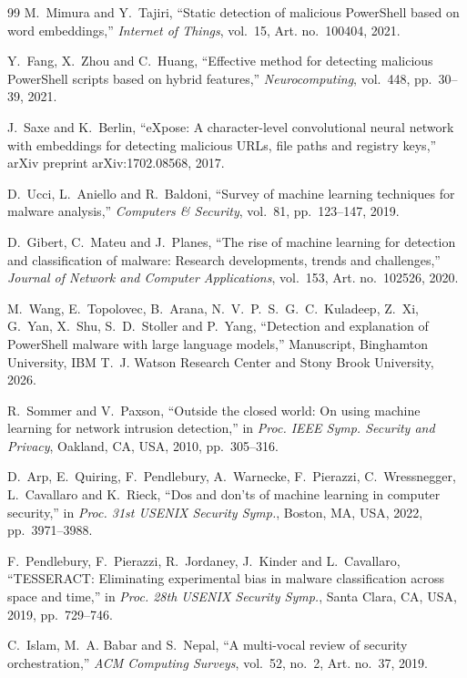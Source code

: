 \documentclass[12pt,a4paper]{article}
\begin{document}
\begin{thebibliography}{99}
 M.~Mimura and Y.~Tajiri, ``Static detection of malicious PowerShell based on word embeddings,'' \emph{Internet of Things}, vol.~15, Art. no.~100404, 2021.

 Y.~Fang, X.~Zhou and C.~Huang, ``Effective method for detecting malicious PowerShell scripts based on hybrid features,'' \emph{Neurocomputing}, vol.~448, pp.~30--39, 2021.

 J.~Saxe and K.~Berlin, ``eXpose: A character-level convolutional neural network with embeddings for detecting malicious URLs, file paths and registry keys,'' arXiv preprint arXiv:1702.08568, 2017.

 D.~Ucci, L.~Aniello and R.~Baldoni, ``Survey of machine learning techniques for malware analysis,'' \emph{Computers \& Security}, vol.~81, pp.~123--147, 2019.

 D.~Gibert, C.~Mateu and J.~Planes, ``The rise of machine learning for detection and classification of malware: Research developments, trends and challenges,'' \emph{Journal of Network and Computer Applications}, vol.~153, Art. no.~102526, 2020.

 M.~Wang, E.~Topolovec, B.~Arana, N.~V.~P.~S.~G.~C.~Kuladeep, Z.~Xi, G.~Yan, X.~Shu, S.~D.~Stoller and P.~Yang, ``Detection and explanation of PowerShell malware with large language models,'' Manuscript, Binghamton University, IBM T.~J. Watson Research Center and Stony Brook University, 2026.

 R.~Sommer and V.~Paxson, ``Outside the closed world: On using machine learning for network intrusion detection,'' in \emph{Proc. IEEE Symp. Security and Privacy}, Oakland, CA, USA, 2010, pp.~305--316.

 D.~Arp, E.~Quiring, F.~Pendlebury, A.~Warnecke, F.~Pierazzi, C.~Wressnegger, L.~Cavallaro and K.~Rieck, ``Dos and don'ts of machine learning in computer security,'' in \emph{Proc. 31st USENIX Security Symp.}, Boston, MA, USA, 2022, pp.~3971--3988.

 F.~Pendlebury, F.~Pierazzi, R.~Jordaney, J.~Kinder and L.~Cavallaro, ``TESSERACT: Eliminating experimental bias in malware classification across space and time,'' in \emph{Proc. 28th USENIX Security Symp.}, Santa Clara, CA, USA, 2019, pp.~729--746.

 C.~Islam, M.~A. Babar and S.~Nepal, ``A multi-vocal review of security orchestration,'' \emph{ACM Computing Surveys}, vol.~52, no.~2, Art. no.~37, 2019.


\end{thebibliography}
\end{document}
